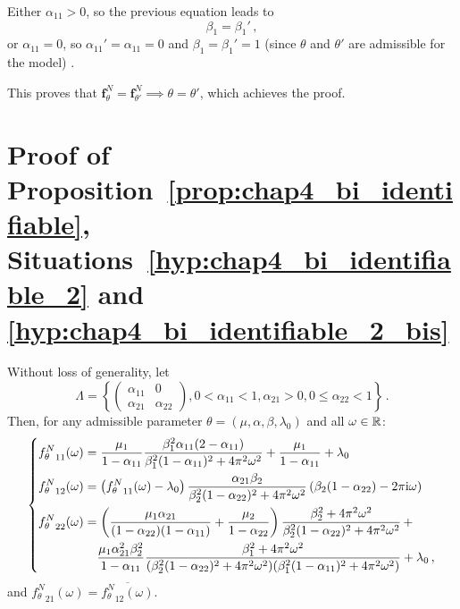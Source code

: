 \begin{subappendices}
Either $\alpha_{11} > 0$, so the previous equation leads to
\[
\beta_1 = \beta_1' \,,
\]
or $\alpha_{11} = 0$, so $\alpha_{11}' = \alpha_{11} = 0$ and $\beta_1 = \beta_1' = 1$ (since $\theta$ and $\theta'$ are admissible for the model) .

This proves that $\mathbf{f}_\theta^N = \mathbf{f}_{\theta'}^N \implies \theta = \theta'$, which achieves the proof.






\section{Proof of Proposition~\ref{prop:chap4_bi_identifiable}, Situations~\ref{hyp:chap4_bi_identifiable_2} and \ref{hyp:chap4_bi_identifiable_2_bis}}\label{appendix:chap4_bi_identifiable_2}

Without loss of generality, let
\[\Lambda = \left\{ \begin{pmatrix} \alpha_{11} & 0 \\ \alpha_{21} & \alpha_{22} \end{pmatrix}, 0 < \alpha_{11} < 1, \alpha_{21} > 0 , 0 \le \alpha_{22} < 1 \right\}\,.\]
Then, for any admissible parameter $\theta = (\mu, \alpha, \beta, \lambda_0)$ and all $\omega\in{\mathbb R}$:
\[\begin{dcases}
{f_\theta^N}_{11}(\omega) = \dfrac{\mu_1}{1-\alpha_{11}} \dfrac{\beta_1^2 \alpha_{11}(2-\alpha_{11})}{\beta_1^2(1-\alpha_{11})^2 + 4 \pi^2\omega^2} + \dfrac{\mu_1}{1-\alpha_{11}} + \lambda_0\\
{f_\theta^N}_{12}(\omega) = \left( {f_\theta^N}_{11}(\omega) - \lambda_0 \right) \dfrac{\alpha_{21} \beta_2}{\beta_2^2(1-\alpha_{22})^2 + 4\pi^2\omega^2}\left(\beta_2(1-\alpha_{22}) - 2 \pi \iu \omega\right)\\
{f_\theta^N}_{22}(\omega) = \left( \dfrac{\mu_1 \alpha_{21}}{(1-\alpha_{22})(1-\alpha_{11})} + \dfrac{\mu_2}{1-\alpha_{22}} \right)\dfrac{\beta_2^2 + 4\pi^2\omega^2}{\beta_2^2(1-\alpha_{22})^2 + 4\pi^2\omega^2} \,+ \\
\phantom{{f_\theta^N}_{22}(\omega) = } \dfrac{\mu_1 \alpha_{21}^2 \beta_2^2 }{1-\alpha_{11}} \dfrac{\beta_1^2 + 4\pi^2\omega^2}{(\beta_2^2(1-\alpha_{22})^2 + 4\pi^2\omega^2)(\beta_1^2(1-\alpha_{11})^2 + 4\pi^2\omega^2)} + \lambda_0\,,
\end{dcases}
\]
and ${f_\theta^N}_{21}(\omega) = \overline{{f_\theta^N}_{12}(\omega)}$.


\end{subappendices}

